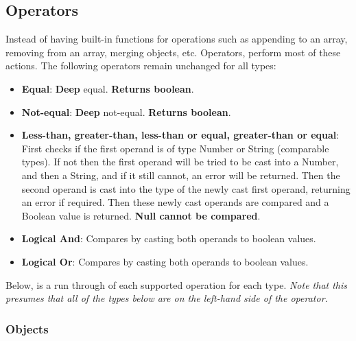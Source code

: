 \subsection{Operators}
\label{sec:hello-sttp-operators}

Instead of having built-in functions for operations such as appending to an array, removing from an array, merging objects, etc. Operators, perform most of these actions. The following operators remain unchanged for all types:

\begin{itemize}
    \item \textbf{Equal}: \textbf{Deep} equal. \textbf{Returns boolean}.
    \item \textbf{Not-equal}: \textbf{Deep} not-equal. \textbf{Returns boolean}.
    \item \textbf{Less-than, greater-than, less-than or equal, greater-than or equal}: First checks if the first operand is of type Number or String (comparable types). If not then the first operand will be tried to be cast into a Number, and then a String, and if it still cannot, an error will be returned. Then the second operand is cast into the type of the newly cast first operand, returning an error if required. Then these newly cast operands are compared and a Boolean value is returned. \textbf{Null cannot be compared}.
    \item \textbf{Logical And}: Compares by casting both operands to boolean values.
    \item \textbf{Logical Or}: Compares by casting both operands to boolean values.
\end{itemize}

Below, is a run through of each supported operation for each type. \textit{Note that this presumes that all of the types below are on the left-hand side of the operator.}

\subsubsection{Objects}

